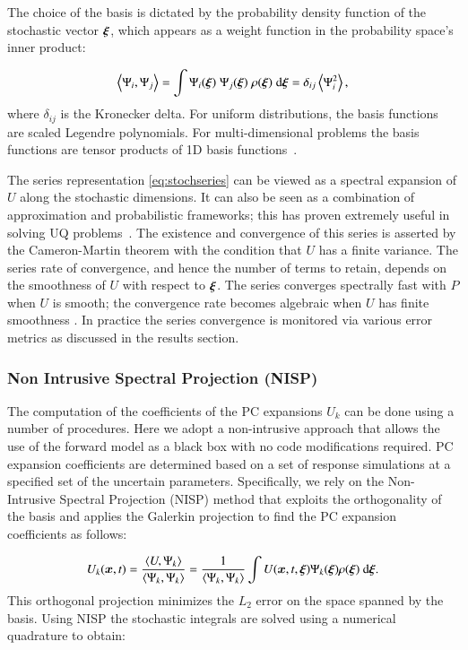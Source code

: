 The choice of the basis is dictated by the probability density
function of the stochastic vector $\xxi$, which appears as a weight
function in the probability space's inner product:

\begin{equation}
 \left<\Psi_i,\Psi_j\right> = \int \Psi_i(\xxi) \;\Psi_j(\xxi) \; \rho(\xxi) \; \mbox{d}\xxi=\delta_{ij}\ave{\Psi_i^2},
\label{eq:inner}
\end{equation}
where $\delta_{ij}$ is the Kronecker delta.
For uniform
distributions, the basis functions are scaled Legendre polynomials.
For multi-dimensional problems the basis functions are
tensor products of 1D basis functions~\cite{LeMaitreKnio2010}.

The series representation \eqref{eq:stochseries} can be viewed as a spectral expansion
of $U$ along the stochastic dimensions. It can also be seen as a
combination of approximation and probabilistic frameworks; this
 has proven extremely useful in solving UQ problems~\cite{Xiu:2003,Lin2009}. The existence and convergence of this series is asserted by the Cameron-Martin theorem \citep{Cameron:1947} with the condition that $U$ has a finite variance.
The series rate of convergence, and hence the number of terms to retain, depends on the smoothness of
$U$ with respect to $\xxi$. The series converges spectrally fast with $P$
when $U$ is smooth; the convergence rate becomes algebraic
when $U$ has finite smoothness \citep{Canuto:2006}. In practice the series convergence is monitored 
via various error metrics as discussed in the results section.

\subsubsection{Non Intrusive Spectral Projection (NISP)}
The computation of the coefficients of the PC expansions $U_k$
can be done using a number of procedures. Here we adopt a non-intrusive
approach that allows the use of the forward model \geoclaw as a black box
with no code modifications required. PC expansion coefficients are determined
based on a set of response \geoclaw simulations at a specified set of the uncertain parameters. 
Specifically, we rely on the Non-Intrusive Spectral Projection (NISP) method that exploits the orthogonality of the basis and applies the Galerkin projection to find the PC expansion coefficients as follows:

\begin{equation}
 U_k(\bm{x},t) = \frac{\left< U, \Psi_k \right>}{\left< \Psi_k, \Psi_k \right>} = 
 \frac{1}{\left< \Psi_k, \Psi_k \right>} 
 \int U(\bm{x},t,\xxi) \Psi_k(\xxi) \rho(\xxi) \mbox{ d}\xxi.
\end{equation}
This orthogonal projection minimizes the $L_2$ error on the space spanned by the basis.
Using NISP the stochastic integrals are solved using a numerical quadrature to obtain:

